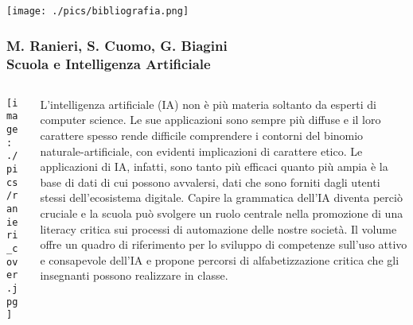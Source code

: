 \documentclass[aspectratio=169]{beamer}
\begin{document}
%
%
\begin{frame}
    \centering
    \texttt{[image: ./pics/bibliografia.png]}
\end{frame}
%
%
\begin{frame}
\frametitle{\small M. Ranieri, S. Cuomo, G. Biagini \\ \normalsize \textbf{Scuola e Intelligenza Artificiale}}
\begin{columns}[c]
\begin{column}{0.35\textwidth}
    \centering
    \texttt{[image: ./pics/ranieri\_cover.jpg]}
\end{column}
\begin{column}{0.6\textwidth}
    {\small
    L'intelligenza artificiale (IA) non è più materia soltanto da esperti di computer science. Le sue applicazioni sono sempre più diffuse e il loro carattere spesso rende difficile comprendere i contorni del binomio naturale-artificiale, con evidenti implicazioni di carattere etico. Le applicazioni di IA, infatti, sono tanto più efficaci quanto più ampia è la base di dati di cui possono avvalersi, dati che sono forniti  dagli utenti stessi dell'ecosistema digitale. Capire la grammatica dell'IA diventa perciò cruciale e la scuola può svolgere un ruolo centrale nella promozione di una literacy critica sui processi di automazione delle nostre società. Il volume offre un quadro di riferimento per lo sviluppo di competenze sull'uso attivo e consapevole dell'IA e propone percorsi di alfabetizzazione critica che gli insegnanti possono realizzare in classe.}
\end{column}
\end{columns}
\end{frame}
%
%
\end{document}
